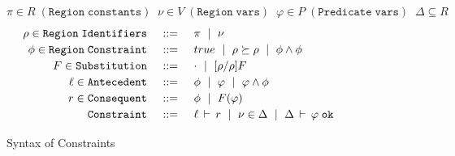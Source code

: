 \begin{figure*}[!t]

\[
   \pi \in R \; \mathtt{ (Region \; constants) } \;\;
   \nu \in V \; \mathtt{ (Region \; vars) } \;\;
   \varphi \in P \; \mathtt{ (Predicate \; vars) } \;\;
   \Delta \subseteq R
\]
\[
\renewcommand{\arraystretch}{1.2}
\setlength{\arraycolsep}{7pt}
\begin{array}{rcl} 


\rho \in \mathtt{Region \; Identifiers} & \coloneqq & \pi \ALT \nu \\

\phi \in \mathtt{Region \; Constraint} & \coloneqq & true \ALT \rho \outlives \rho \ALT \phi \conj \phi \\

F \in \mathtt{Substitution} & \coloneqq & \cdot \ALT [\rho/\rho]F \\

\ell \in \mathtt{Antecedent} & \coloneqq & \phi \ALT \varphi \ALT \varphi \conj \phi \\

r \in \mathtt{Consequent} & \coloneqq & \phi \ALT F(\varphi) \\

\mathtt{Constraint} & \coloneqq & \isvalid{\ell}{r} \ALT \nu \in \Delta \ALT \tywf{\Delta}{\varphi} \\

\end{array}
\]

\caption{Syntax of Constraints}
\label{fig:constraint-syntax}
\end{figure*}
